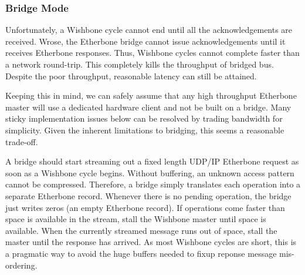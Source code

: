 \documentclass{article}
\begin{document}
\subsubsection{Bridge Mode}
\label{sec:bridge}

Unfortunately, 
a Wishbone cycle cannot end until all the acknowledgements are received.
Wrose, the Etherbone bridge cannot issue acknowledgements until 
it receives Etherbone responses.
Thus, Wishbone cycles cannot complete faster than a network round-trip.
This completely kills the throughput of bridged bus.
Despite the poor throughput, 
reasonable latency can still be attained.

Keeping this in mind,
we can safely assume that any high throughput Etherbone master will use 
a dedicated hardware client and not be built on a bridge.
Many sticky implementation issues below can be resolved by 
trading bandwidth for simplicity.
Given the inherent limitations to bridging,
this seems a reasonable trade-off.

A bridge should start streaming out a fixed length UDP/IP Etherbone 
request as soon as a Wishbone cycle begins.
Without buffering,
an unknown access pattern cannot be compressed.
Therefore, 
a bridge simply translates each operation into a separate Etherbone record.
Whenever there is no pending operation,
the bridge just writes zeros (an empty Etherbone record).
If operations come faster than space is available in the stream,
stall the Wishbone master until space is available.
When the currently streamed message runs out of space,
stall the master until the response has arrived.
As most Wishbone cycles are short,
this is a pragmatic way to avoid the huge buffers needed to 
fixup reponse message mis-ordering.
\end{document}
